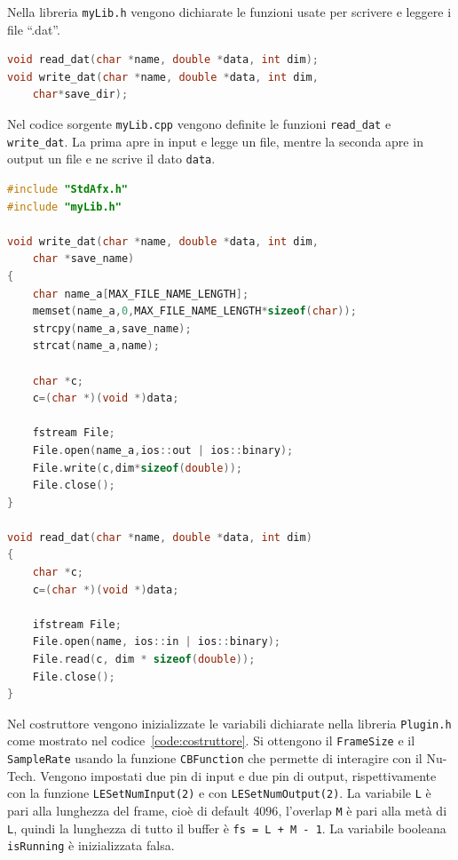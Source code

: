 \documentclass[12pt,a4paper,titlepage]{article}
\begin{document}
Nella libreria \texttt{myLib.h} vengono dichiarate le funzioni usate per scrivere e leggere i file ``.dat''.

\begin{lstlisting}[language=cpp, label=code:myLib.h, caption = Libreria \texttt{myLib.h}, breaklines = false, captionpos = b]
void read_dat(char *name, double *data, int dim);
void write_dat(char *name, double *data, int dim, 
	char*save_dir);
\end{lstlisting}

Nel codice sorgente \texttt{myLib.cpp} vengono definite le funzioni \texttt{read\_dat} e \texttt{write\_dat}. La prima apre in input e legge un file, mentre la seconda apre in output un file e ne scrive il dato \texttt{data}.

\begin{lstlisting}[language=cpp, label=code:myLib.cpp, caption = File \texttt{myLib.cpp}, breaklines = false, breaklines = false, captionpos = b]
#include "StdAfx.h"
#include "myLib.h"

void write_dat(char *name, double *data, int dim, 
	char *save_name) 
{
	char name_a[MAX_FILE_NAME_LENGTH];
	memset(name_a,0,MAX_FILE_NAME_LENGTH*sizeof(char));
	strcpy(name_a,save_name);
	strcat(name_a,name);

	char *c;
	c=(char *)(void *)data;

	fstream File;
	File.open(name_a,ios::out | ios::binary);
	File.write(c,dim*sizeof(double));
	File.close();
}

void read_dat(char *name, double *data, int dim) 
{
	char *c;
	c=(char *)(void *)data;

	ifstream File;
	File.open(name, ios::in | ios::binary);
	File.read(c, dim * sizeof(double));
	File.close();
}
\end{lstlisting}

Nel costruttore vengono inizializzate le variabili dichiarate nella libreria \texttt{Plugin.h} come mostrato nel codice~\ref{code:costruttore}. Si ottengono il \texttt{FrameSize} e il \texttt{SampleRate} usando la funzione \texttt{CBFunction} che permette di interagire con il Nu-Tech. Vengono impostati due pin di input e due pin di output, rispettivamente con la funzione \texttt{LESetNumInput(2)} e con \texttt{LESetNumOutput(2)}. La variabile \texttt{L} è pari alla lunghezza del frame, cioè di default $4096$, l'overlap \texttt{M} è pari alla metà di \texttt{L}, quindi la lunghezza di tutto il buffer è \texttt{fs = L + M - 1}. La variabile booleana \texttt{isRunning} è inizializzata falsa.
\end{document}
